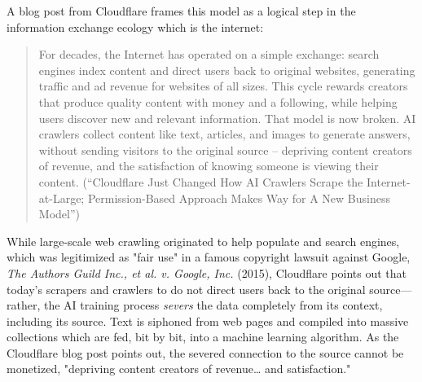 \documentclass[11pt]{article}
\begin{document}
\begin{enumerate}
A blog post from Cloudflare frames this model as a logical step in the
information exchange ecology which is the internet:
\begin{quote}
For decades, the Internet has operated on a simple exchange: search
engines index content and direct users back to original websites,
generating traffic and ad revenue for websites of all sizes. This
cycle rewards creators that produce quality content with money and a
following, while helping users discover new and relevant information.
That model is now broken. AI crawlers collect content like text,
articles, and images to generate answers, without sending visitors to
the original source – depriving content creators of revenue, and the
satisfaction of knowing someone is viewing their content. (“Cloudflare
Just Changed How AI Crawlers Scrape the Internet-at-Large;
Permission-Based Approach Makes Way for A New Business Model”)
\end{quote}
While large-scale web crawling originated to help populate and search
engines, which was legitimized as "fair use" in a famous copyright
lawsuit against Google, \emph{The Authors Guild Inc., et al. v. Google,
Inc.} (2015), Cloudflare points out that today's scrapers and crawlers
to do not direct users back to the original source---rather, the AI
training process \emph{severs} the data completely from its context,
including its source. Text is siphoned from web pages and compiled
into massive collections which are fed, bit by bit, into a machine
learning algorithm. As the Cloudflare blog post points out, the
severed connection to the source cannot be monetized, "depriving
content creators of revenue\ldots{} and satisfaction."


\end{enumerate}
\end{document}
